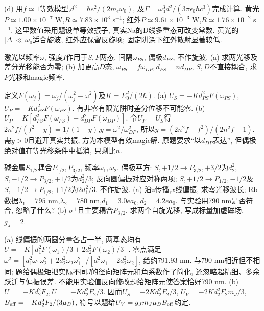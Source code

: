 \begin{solution}
\begin{center}\end{center}

(d) 用$f\simeq1$等效模型,$d^2=\hbar e^2/(2m_e\omega_0)$, 及$\Gamma=\omega_0^3d^2/(3\pi\epsilon_0\hbar c^3)$完成计算. 黄光$P\simeq1.00\times10^{-7}$ W,$R\simeq7.83\times10^3$ s$^{-1}$; 红外$P\simeq9.61\times10^{-3}$ W,$R\simeq1.76\times10^{-2}$ s$^{-1}$. 这里数值采用题设单等效振子, 真实Na的D线多重态可改变常数. 黄光的$|\Delta|\ll\omega_0$适合旋波, 红外应保留反旋项; 固定阱深下红外散射显著较低.
\end{solution}
\begin{exercise}激光以频率$\omega$, 强度$I$作用于$S,P$两态, 间隔$\omega_{PS}$, 偶极$d_{PS}$, 不作旋波. (a) 求两光移及差分光移能否为零; (b) 加更高$D$态, $\omega_{PS}=f\omega_{DP},d_{PS}=nd_{DP}$, $S,D$不直接耦合, 求$P$光移和magic频率.\end{exercise}
\begin{solution}定义$F(\omega_j)=\omega_j/(\omega_j^2-\omega^2)$及$K=E_0^2/(2\hbar)$. (a) $U_S=-Kd_{PS}^2F(\omega_{PS})$,$U_P=+Kd_{PS}^2F(\omega_{PS})$. 有非零有限光阱时差分位移不可能零. (b) $U_P=K[d_{PS}^2F(\omega_{PS})-d_{DP}^2F(\omega_{DP})]$. 令$U_P=U_S$得$2n^2f/(f^2-y)=1/(1-y)$,$y=\omega^2/\omega_{DP}^2$, 所以$y=(2n^2f-f^2)/(2n^2f-1)$. 需$y>0$且避开真实共振, 方为本模型有效magic解. 原题要求“以$d_{DP}$表达”, 但偶极绝对值在等光移条件中抵消, 只剩比$n$.
\end{solution}
\begin{exercise}碱金属$S_{1/2}$耦合$P_{1/2},P_{3/2}$, 频率$\omega_1,\omega_2$. 偶极平方: $S,+1/2\to P_{3/2},+3/2$为$d_2^2$, $S,-1/2\to P_{3/2},+1/2$为$d_2^2/3$; 反向圆偏振对应对称两项; $S,+1/2\to P_{1/2},-1/2$及$S,-1/2\to P_{1/2},+1/2$为$2d_1^2/3$. 不作旋波. (a) 沿$z$传播,$x$线偏振, 求零光移波长; Rb数据$\lambda_1=795$ nm,$\lambda_2=780$ nm,$d_1=3.0ea_0,d_2=4.2ea_0$. 与实验用790 nm是否符合, 忽略了什么? (b) $\sigma^+$且主要耦合$P_{3/2}$, 求两个自旋光移, 写成标量加虚磁场,$g_J=2$.\end{exercise}
\begin{solution}(a) 线偏振的两圆分量各占一半, 两基态均有$U=-K[d_1^2F(\omega_1)/3+2d_2^2F(\omega_2)/3]$. 零点满足$\omega^2=[d_1^2\omega_1\omega_2^2+2d_2^2\omega_2\omega_1^2]/[d_1^2\omega_1+2d_2^2\omega_2]$, 给约791.93 nm. 与790 nm相近但不相同; 题给偶极矩把实际不同$J$的径向矩阵元和角系数作了简化, 还忽略超精细、多余跃迁与偏振误差. 不能用实验值反向修改题给矩阵元使答案恰好790 nm. (b) $U_+=-Kd_2^2F_2,U_-=-Kd_2^2F_2/3$. 因而$U_S=-2Kd_2^2F_2/3$, $U_V=-2Kd_2^2F_2m_J/3$, $B_{\rm eff}=-Kd_2^2F_2/(3\mu_B)$, 符号以题给$U_V=g_Jm_J\mu_BB_{\rm eff}$约定.
\end{solution}
